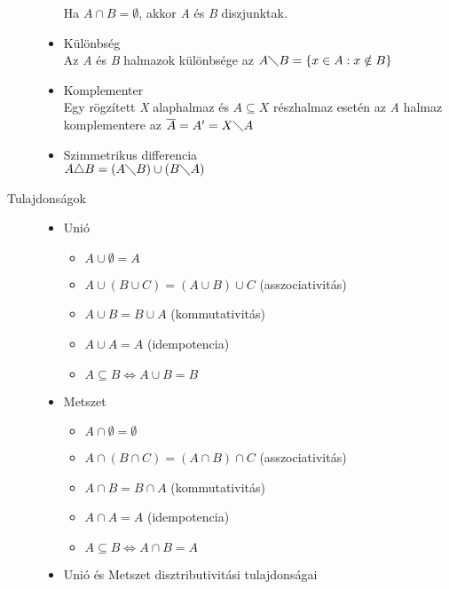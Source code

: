 \documentclass[margin=0px]{article}
\begin{document}
\begin{description}
\begin{itemize}
                  Ha $A \cap B = \emptyset$, akkor {\it A} és {\it B} diszjunktak.
            \item Különbség \\
                  Az {\it A} és {\it B} halmazok különbsége az $A \diagdown B = \{ x \in A : x \notin B \}$
            \item Komplementer \\
                  Egy rögzített {\it X} alaphalmaz és $A \subseteq X$ részhalmaz esetén az {\it A} halmaz komplementere az $ \overline{A} = A' = X \diagdown A$
            \item Szimmetrikus differencia \\
                  $A \triangle B = (A \diagdown B) \cup (B \diagdown A)$
        \end{itemize}
    \item[Tulajdonságok] \hfill
        \begin{itemize}
            \item Unió
                  \begin{itemize}
                      \item $A \cup \emptyset = A$
                      \item $A \cup ( B \cup C ) = (A \cup B) \cup C$ (asszociativitás)
                      \item $A \cup B = B \cup A$ (kommutativitás)
                      \item $A \cup A = A$ (idempotencia)
                      \item $A \subseteq B \Longleftrightarrow A \cup B = B$
                  \end{itemize}
            \item Metszet
                  \begin{itemize}
                      \item $A \cap \emptyset = \emptyset$
                      \item $A \cap ( B \cap C ) = (A \cap B) \cap C$ (asszociativitás)
                      \item $A \cap B = B \cap A$ (kommutativitás)
                      \item $A \cap A = A$ (idempotencia)
                      \item $A \subseteq B \Longleftrightarrow A \cap B = A$
                  \end{itemize}
            \item Unió és Metszet disztributivitási tulajdonságai
                  \begin{itemize}

\end{itemize}
\end{itemize}
\end{description}
\end{document}
